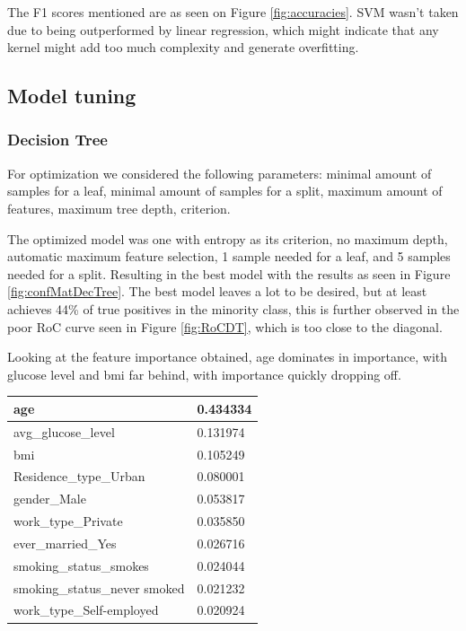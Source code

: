 \documentclass[11pt, a4paper]{article}
\begin{document}
The F1 scores mentioned are as seen on Figure \ref{fig:accuracies}. SVM wasn't taken due to being outperformed by linear regression, which might indicate that any kernel might add too much complexity and generate overfitting.

\subsection{Model tuning}


\subsubsection{Decision Tree}

For optimization we considered the following parameters: minimal amount of samples for a leaf, minimal amount of samples for a split, maximum amount of features, maximum tree depth, criterion.

The optimized model was one with entropy as its criterion, no maximum depth, automatic maximum feature selection, 1 sample needed for a leaf, and 5 samples needed for a split. Resulting in the best model with the results as seen in Figure \ref{fig:confMatDecTree}.  The best model leaves a lot to be desired, but at least achieves 44\% of true positives in the minority class, this is further observed in the poor RoC curve seen in Figure \ref{fig:RoCDT}, which is too close to the diagonal.

Looking at the feature importance obtained, age dominates in importance, with glucose level and bmi far behind, with importance quickly dropping off. 

\begin{table}[H]
\begin{tabular}{|l|l|}
\hline
age                           & 0.434334 \\ \hline
avg\_glucose\_level           & 0.131974 \\ \hline
bmi                           & 0.105249 \\ \hline
Residence\_type\_Urban        & 0.080001 \\ \hline
gender\_Male                  & 0.053817 \\ \hline
work\_type\_Private           & 0.035850 \\ \hline
ever\_married\_Yes            & 0.026716 \\ \hline
smoking\_status\_smokes       & 0.024044 \\ \hline
smoking\_status\_never smoked & 0.021232 \\ \hline
work\_type\_Self-employed     & 0.020924 \\ \hline
\end{tabular}
\end{table}
\end{document}
